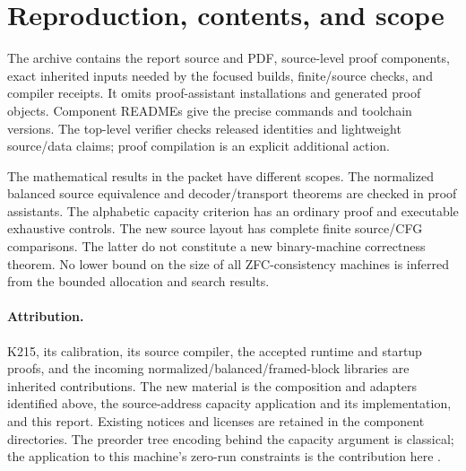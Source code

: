 \documentclass[11pt,letterpaper]{article}
\begin{document}
\section{Reproduction, contents, and scope}
The archive contains the report source and PDF, source-level proof components, exact inherited inputs needed by the focused builds, finite/source checks, and compiler receipts. It omits proof-assistant installations and generated proof objects. Component READMEs give the precise commands and toolchain versions. The top-level verifier checks released identities and lightweight source/data claims; proof compilation is an explicit additional action.

The mathematical results in the packet have different scopes. The normalized balanced source equivalence and decoder/transport theorems are checked in proof assistants. The alphabetic capacity criterion has an ordinary proof and executable exhaustive controls. The new source layout has complete finite source/CFG comparisons. The latter do not constitute a new binary-machine correctness theorem. No lower bound on the size of all ZFC-consistency machines is inferred from the bounded allocation and search results.

\paragraph{Attribution.}
K215, its calibration, its source compiler, the accepted runtime and startup proofs, and the incoming normalized/balanced/framed-block libraries are inherited contributions. The new material is the composition and adapters identified above, the source-address capacity application and its implementation, and this report. Existing notices and licenses are retained in the component directories. The preorder tree encoding behind the capacity argument is classical; the application to this machine's zero-run constraints is the contribution here \cite{lukasiewicz}.
\end{document}
